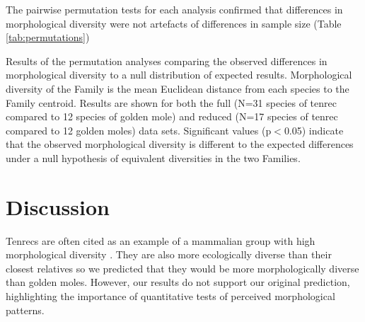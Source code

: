 \documentclass[12pt,a4paper]{article}
\begin{document}
	The pairwise permutation tests for each analysis confirmed that differences in morphological diversity were not artefacts of differences in sample size (Table \ref{tab:permutations})
\begin{table}[!htbp]			
	\caption[Results of the permutation tests]{Results of the permutation analyses comparing the observed differences in morphological diversity to a null distribution of expected results. Morphological diversity of the Family is the mean Euclidean distance from each species to the Family centroid. Results are shown for both the full (N=31 species of tenrec compared to 12 species of golden mole) and reduced (N=17 species of tenrec compared to 12 golden moles) data sets. Significant values (p$<$0.05) indicate that the observed morphological diversity is different to the expected differences under a null hypothesis of equivalent diversities in the two Families.}
		 
		\label{tab:permutations}  
	\end{table}
\section{Discussion}
	Tenrecs are often cited as an example of a mammalian group with high morphological diversity \citep{Olson2013, Soarimalala2011, Eisenberg1969}. They are also more ecologically diverse than their closest relatives \citep{Soarimalala2011, Bronner1995} so we predicted that they would be more morphologically diverse than golden moles. However, our results do not support our original prediction, highlighting the importance of quantitative tests of perceived morphological patterns.
\end{document}
